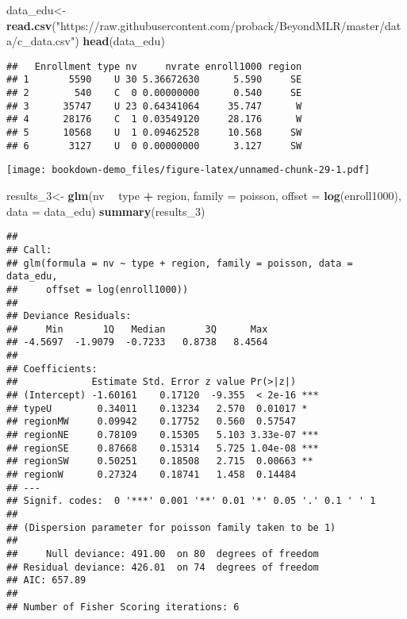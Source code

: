 \documentclass[]{book}
\newenvironment{Shaded}{\begin{snugshade}}{\end{snugshade}}
\newcommand{\DataTypeTok}[1]{\textcolor[rgb]{0.13,0.29,0.53}{#1}}
\newcommand{\DecValTok}[1]{\textcolor[rgb]{0.00,0.00,0.81}{#1}}
\newcommand{\KeywordTok}[1]{\textcolor[rgb]{0.13,0.29,0.53}{\textbf{#1}}}
\newcommand{\NormalTok}[1]{#1}
\newcommand{\OperatorTok}[1]{\textcolor[rgb]{0.81,0.36,0.00}{\textbf{#1}}}
\newcommand{\StringTok}[1]{\textcolor[rgb]{0.31,0.60,0.02}{#1}}
\begin{document}
\begin{Shaded}
\begin{Highlighting}[]
\NormalTok{data_edu<-}\KeywordTok{read.csv}\NormalTok{(}\StringTok{"https://raw.githubusercontent.com/proback/BeyondMLR/master/data/c_data.csv"}\NormalTok{)}
\KeywordTok{head}\NormalTok{(data_edu)}
\end{Highlighting}
\end{Shaded}

\begin{verbatim}
##   Enrollment type nv     nvrate enroll1000 region
## 1       5590    U 30 5.36672630      5.590     SE
## 2        540    C  0 0.00000000      0.540     SE
## 3      35747    U 23 0.64341064     35.747      W
## 4      28176    C  1 0.03549120     28.176      W
## 5      10568    U  1 0.09462528     10.568     SW
## 6       3127    U  0 0.00000000      3.127     SW
\end{verbatim}

\begin{Shaded}
\end{Shaded}

\texttt{[image: bookdown-demo\_files/figure-latex/unnamed-chunk-29-1.pdf]}

\begin{Shaded}
\begin{Highlighting}[]
\NormalTok{results_}\DecValTok{3}\NormalTok{<-}\StringTok{ }\KeywordTok{glm}\NormalTok{(nv }\OperatorTok{~}\StringTok{ }\NormalTok{type }\OperatorTok{+}\StringTok{ }\NormalTok{region, }\DataTypeTok{family =}\NormalTok{ poisson,}
               \DataTypeTok{offset =} \KeywordTok{log}\NormalTok{(enroll1000), }\DataTypeTok{data =}\NormalTok{ data_edu)}
\KeywordTok{summary}\NormalTok{(results_}\DecValTok{3}\NormalTok{)}
\end{Highlighting}
\end{Shaded}

\begin{verbatim}
## 
## Call:
## glm(formula = nv ~ type + region, family = poisson, data = data_edu, 
##     offset = log(enroll1000))
## 
## Deviance Residuals: 
##     Min       1Q   Median       3Q      Max  
## -4.5697  -1.9079  -0.7233   0.8738   8.4564  
## 
## Coefficients:
##             Estimate Std. Error z value Pr(>|z|)    
## (Intercept) -1.60161    0.17120  -9.355  < 2e-16 ***
## typeU        0.34011    0.13234   2.570  0.01017 *  
## regionMW     0.09942    0.17752   0.560  0.57547    
## regionNE     0.78109    0.15305   5.103 3.33e-07 ***
## regionSE     0.87668    0.15314   5.725 1.04e-08 ***
## regionSW     0.50251    0.18508   2.715  0.00663 ** 
## regionW      0.27324    0.18741   1.458  0.14484    
## ---
## Signif. codes:  0 '***' 0.001 '**' 0.01 '*' 0.05 '.' 0.1 ' ' 1
## 
## (Dispersion parameter for poisson family taken to be 1)
## 
##     Null deviance: 491.00  on 80  degrees of freedom
## Residual deviance: 426.01  on 74  degrees of freedom
## AIC: 657.89
## 
## Number of Fisher Scoring iterations: 6
\end{verbatim}
\end{document}

